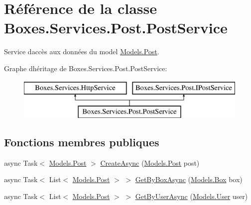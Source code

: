 \hypertarget{class_boxes_1_1_services_1_1_post_1_1_post_service}{}\section{Référence de la classe Boxes.\+Services.\+Post.\+Post\+Service}
\label{class_boxes_1_1_services_1_1_post_1_1_post_service}


Service d\textquotesingle{}accès aux données du model \hyperlink{class_boxes_1_1_models_1_1_post}{Models.\+Post}.  


Graphe d\textquotesingle{}héritage de Boxes.\+Services.\+Post.\+Post\+Service\+:\begin{figure}[H]
\begin{center}
\leavevmode
\includegraphics[height=2.000000cm]{class_boxes_1_1_services_1_1_post_1_1_post_service}
\end{center}
\end{figure}
\subsection*{Fonctions membres publiques}
\begin{DoxyCompactItemize}
\item 
async Task$<$ \hyperlink{class_boxes_1_1_models_1_1_post}{Models.\+Post} $>$ \hyperlink{class_boxes_1_1_services_1_1_post_1_1_post_service_a096d0fd09440f8e2e8b36f63821ea378}{Create\+Async} (\hyperlink{class_boxes_1_1_models_1_1_post}{Models.\+Post} post)
\item 
async Task$<$ List$<$ \hyperlink{class_boxes_1_1_models_1_1_post}{Models.\+Post} $>$ $>$ \hyperlink{class_boxes_1_1_services_1_1_post_1_1_post_service_aec47dfed6fdbc2edcaa34a9afc1900bf}{Get\+By\+Box\+Async} (\hyperlink{class_boxes_1_1_models_1_1_box}{Models.\+Box} box)
\item 
async Task$<$ List$<$ \hyperlink{class_boxes_1_1_models_1_1_post}{Models.\+Post} $>$ $>$ \hyperlink{class_boxes_1_1_services_1_1_post_1_1_post_service_a55a2b7e659f9e917de05483b03e8dce8}{Get\+By\+User\+Async} (\hyperlink{class_boxes_1_1_models_1_1_user}{Models.\+User} user)
\end{DoxyCompactItemize}


